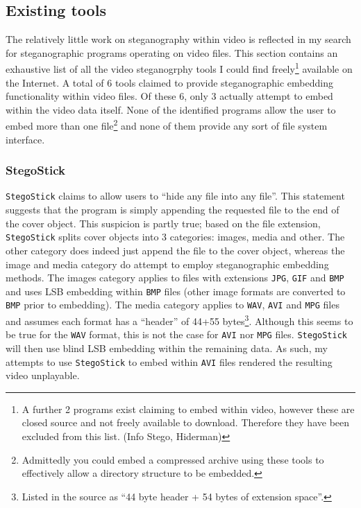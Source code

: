 \documentclass[paper=a4, fontsize=11pt,twoside]{scrartcl}    %
\numberwithin{table}{section}
\numberwithin{figure}{section}
\begin{document}
\subsection{Existing tools}
The relatively little work on steganography within video is reflected in my search for steganographic programs operating on video files. This section contains an exhaustive list of all the video steganogrphy tools I could find freely\footnote{A further 2 programs exist claiming to embed within video, however these are closed source and not freely available to download. Therefore they have been excluded from this list. (Info Stego, Hiderman)} available on the Internet. A total of 6 tools claimed to provide steganographic embedding functionality within video files. Of these 6, only 3 actually attempt to embed within the video data itself. None of the identified programs allow the user to embed more than one file\footnote{Admittedly you could embed a compressed archive using these tools to effectively allow a directory structure to be embedded.}  and none of them provide any sort of file system interface.

\subsubsection{StegoStick}

\texttt{StegoStick} claims to allow users to ``hide any file into any file''. This statement suggests that the program is simply appending the requested file to the end of the cover object. This suspicion is partly true; based on the file extension, \texttt{StegoStick} splits cover objects into 3 categories: images, media and other. The other category does indeed just append the file to the cover object, whereas the image and media category do attempt to employ steganographic embedding methods. The images category applies to files with extensions \texttt{JPG}, \texttt{GIF} and \texttt{BMP} and uses LSB embedding within \texttt{BMP} files (other image formats are converted to \texttt{BMP} prior to embedding). The media category applies to \texttt{WAV}, \texttt{AVI} and \texttt{MPG} files and assumes each format has a ``header'' of 44+55 bytes\footnote{Listed in the source as ``44 byte header + 54 bytes of extension space''.}. Although this seems to be true for the \texttt{WAV} format, this is not the case for \texttt{AVI} nor \texttt{MPG} files. \texttt{StegoStick} will then use blind LSB embedding within the remaining data. As such, my attempts to use \texttt{StegoStick} to embed within \texttt{AVI} files rendered the resulting video unplayable. %
\end{document}

